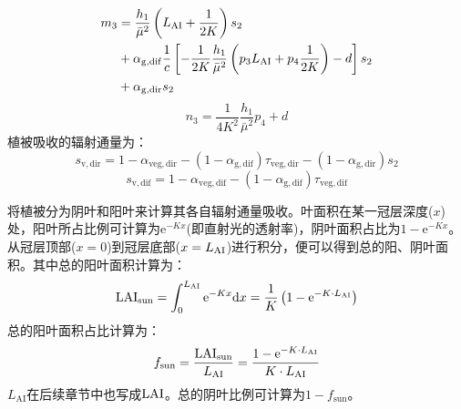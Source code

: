 \begin{equation}
  \begin{aligned}
    m_{3} &=\frac{h_{1}}{\bar{\mu}^{2}}\left(L_{\rm AI}+\frac{1}{2 K}\right) s_{2} \\
    &+\alpha_{\mathrm{g, dif}}\frac{1}{c}\left[-\frac{1}{2 K} \frac{h_{1}}{\bar{\mu}^{2}}\left(p_{3} L_{\rm AI}+p_{4} \frac{1}{2 K}\right)-d\right] s_{2} \\
    &+\alpha_{\mathrm{g, dir}} s_{2}
  \end{aligned}
\end{equation}
\begin{equation}
  n_{3}=\frac{1}{4 K^{2}} \frac{h_{1}}{\bar{\mu}^{2}} p_{4}+d
\end{equation}
植被吸收的辐射通量为：
\begin{equation}
  s_{\mathrm{v, dir}}=1-\alpha_{\mathrm{veg, dir}}-\left(1-\alpha_{\mathrm{g, dif}}\right) \tau_{\mathrm{veg, dir}}-\left(1-\alpha_{\mathrm{g, dir}}\right) s_{2}
\end{equation}
\begin{equation}
  s_{\mathrm{v, dif}}=1-\alpha_{\mathrm{veg, dif}}-\left(1-\alpha_{\mathrm{g, dif}}\right) \tau_{\mathrm{veg, dif}}
\end{equation}

\citet{dai2004two} 将植被分为阴叶和阳叶来计算其各自辐射通量吸收。叶面积在某一冠层深度($x$)处，阳叶所占比例可计算为${\mathrm e}^{-Kx}$(即直射光的透射率)，阴叶面积占比为$1-{\mathrm e}^{-Kx}$。从冠层顶部($x=0$)到冠层底部($x=L_{\rm AI}$)进行积分，便可以得到总的阳、阴叶面积。其中总的阳叶面积计算为：
\begin{equation}
  {\rm LAI}_{\mathrm{sun}}=\int_{0}^{L_{\mathrm{AI}}} {\mathrm e}^{-Kx} {\mathrm d} x=\frac{1}{K}\left(1-{\mathrm e}^{-K \cdot L_{\mathrm{AI}}}\right)
\end{equation}
总的阳叶面积占比计算为：
\begin{equation}
  f_{\mathrm{sun}} = \frac {{\rm LAI}_{\mathrm{sun}}} {L_{\mathrm{AI}}} = \frac {1-{\mathrm e}^{-K
  \cdot L_{\mathrm{AI}}}} {K \cdot L_{\mathrm{AI}} }
\end{equation}
$L_{\mathrm{AI}}$在后续章节中也写成${\rm LAI}$。总的阴叶比例可计算为$1-f_{\mathrm{sun}}$。

